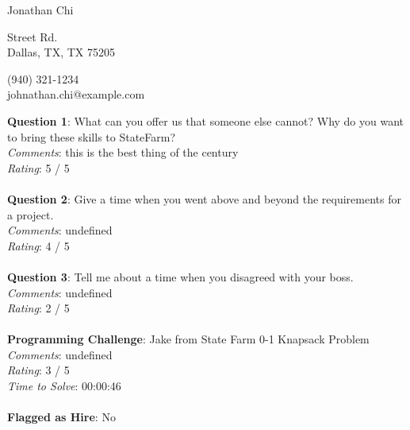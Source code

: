 \documentclass[12pt]{article}
\begin{document}
{\LARGE \begin{center}Jonathan Chi\end{center}}

\begin{multicols}{2}
 Street Rd. \\
Dallas, TX, TX 75205
\columnbreak

\noindent
(940) 321-1234 \\
johnathan.chi@example.com
\end{multicols}

\noindent
\textbf{Question 1}: What can you offer us that someone else cannot? Why do you want to bring these skills to StateFarm?
\\\noindent
\textit{Comments}: this is the best thing of the century
\\\noindent
\textit{Rating}: 5 / 5
\\\\
\noindent
\textbf{Question 2}: Give a time when you went above and beyond the requirements for a project.
\\\noindent
\textit{Comments}: undefined
\\\noindent
\textit{Rating}: 4 / 5
\\\\
\noindent
\textbf{Question 3}: Tell me about a time when you disagreed with your boss.
\\\noindent
\textit{Comments}: undefined
\\\noindent
\textit{Rating}: 2 / 5
\\\\
\noindent
\textbf{Programming Challenge}: Jake from State Farm 0-1 Knapsack Problem
\\\noindent
\textit{Comments}: undefined
\\\noindent
\textit{Rating}: 3 / 5
\\\noindent
\textit{Time to Solve}: 00:00:46
\\\\
\textbf{Flagged as Hire}: No
\\\\ 
\end{document}

